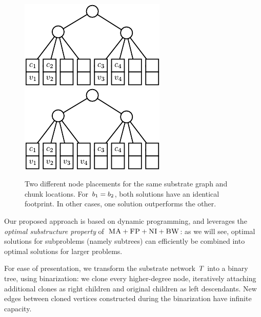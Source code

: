 \begin{figure}
\includegraphics[width = 0.49\columnwidth]{figs/static-mapping/dynamic_bad}
\hfill
\includegraphics[width = 0.49\columnwidth]{figs/static-mapping/dynamic_good}
\caption{Two different node placements for the same substrate graph and chunk
locations. For~$b_1 = b_2$, both solutions have an identical
footprint. In other cases, one solution outperforms the other.}
\label{fig:dynamic_motivation}
\vspace{-1em}
\end{figure}



 Our proposed approach is based on dynamic programming, and
leverages the \emph{optimal substructure property} of~$\textsc{MA}+\textsc{FP}+\textsc{NI}+\textsc{BW}$:
as we will see, optimal solutions for subproblems (namely subtrees)
can efficiently be combined into optimal solutions for larger problems.

For ease of presentation, we transform the
substrate network~$T$
into a binary tree, using binarization:
we clone every higher-degree node,
iteratively attaching additional clones as right children
and original children as left descendants.
New edges between cloned vertices constructed during the binarization have infinite capacity.

